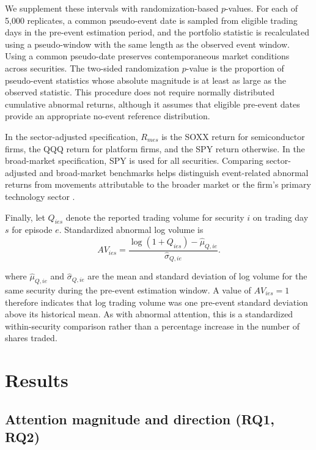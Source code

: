 \elsevierclasstrue\documentclass[preprint,12pt]{elsarticle}%
\begin{document}
We supplement these intervals with randomization-based $p$-values. For each of 5{,}000 replicates, a common pseudo-event date is sampled from eligible trading days in the pre-event estimation period, and the portfolio statistic is recalculated using a pseudo-window with the same length as the observed event window. Using a common pseudo-date preserves contemporaneous market conditions across securities. The two-sided randomization $p$-value is the proportion of pseudo-event statistics whose absolute magnitude is at least as large as the observed statistic. This procedure does not require normally distributed cumulative abnormal returns, although it assumes that eligible pre-event dates provide an appropriate no-event reference distribution.

In the sector-adjusted specification, \(R_{mes}\) is the SOXX return for semiconductor firms, the QQQ return for platform firms, and the SPY return otherwise. In the broad-market specification, SPY is used for all securities. Comparing sector-adjusted and broad-market benchmarks helps distinguish event-related abnormal returns from movements attributable to the broader market or the firm's primary technology sector \citep{mackinlay1997event}.

Finally, let \(Q_{ies}\) denote the reported trading volume for security \(i\) on trading day \(s\) for episode \(e\). Standardized abnormal log volume is
\begin{equation}
AV_{ies}
=
\frac{
  \log\!\left(1+Q_{ies}\right)-\widehat{\mu}_{Q,ie}
}{
  \widehat{\sigma}_{Q,ie}
}.
\label{eq:abnormalvolume}
\end{equation}

where $\widehat{\mu}_{Q,ie}$ and $\widehat{\sigma}_{Q,ie}$ are the mean and standard deviation of log volume for the same security during the pre-event estimation window. A value of $AV_{ies}=1$ therefore indicates that log trading volume was one pre-event standard deviation above its historical mean. As with abnormal attention, this is a standardized within-security comparison rather than a percentage increase in the number of shares traded.


\section{Results}

\subsection{Attention magnitude and direction (RQ1, RQ2)}
\end{document}
